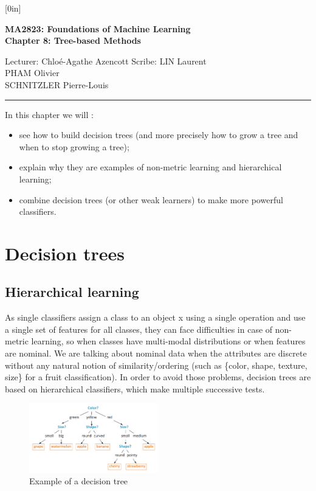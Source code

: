 \documentclass[a4paper,12pt]{article}
\begin{document}
\raisebox{0.6in}[0in]{}
\vspace{-0.7in}

\begin{center}
\bf\large MA2823: Foundations of Machine Learning \\
Chapter 8: Tree-based Methods
\end{center}

\noindent
Lecturer: Chlo\'e-Agathe Azencott   
\hfill
Scribe: LIN Laurent \\
\null \hfill PHAM Olivier \\
\null \hfill SCHNITZLER Pierre-Louis

\noindent
\rule{\textwidth}{1pt}

\medskip

In this chapter we will :
\begin{itemize}
\item see how to build decision trees (and more precisely how to grow a tree and when to stop growing a tree);
\item explain why they are examples of non-metric learning and hierarchical learning;
\item combine decision trees (or other weak learners) to make more powerful classifiers.
\end{itemize}

\section{Decision trees}

\subsection{Hierarchical learning}

As single classifiers assign a class to an object x using a single operation and use a single set of features for all classes, they can face difficulties in case of non-metric learning, so when classes have multi-modal distributions or when features are nominal. We are talking about nominal data when the attributes are discrete without any natural notion of similarity/ordering (such as \{color, shape, texture, size\} for a fruit classification). In order to avoid those problems, decision trees are based on hierarchical classifiers, which make multiple successive tests. \\

\begin{figure}[h]
  \centering
  \includegraphics[width=0.5\textwidth]{figures/Structure.jpg}
  \caption{Example of a decision tree}
  \label{fig:ensemble learning}
\end{figure}
\end{document}
